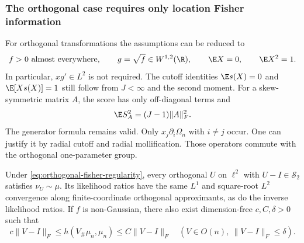 \subsubsection{The orthogonal case requires only location Fisher information}
\label{sec:orthogonal-transformations}

For orthogonal transformations the assumptions can be reduced to
\begin{equation}
 f>0\ \text{almost everywhere},\qquad
 g=\sqrt f\in W^{1,2}(\R),\qquad
 \E X=0,\qquad\E X^2=1.
 \label{eq:orthogonal-fisher-regularity}
\end{equation}
In particular, $xg'\in L^2$ is not required.
The cutoff identities $\E s(X)=0$ and $\E[Xs(X)]=1$ still follow
from $J<\infty$ and the second moment.
For a skew-symmetric matrix $A$, the score has only off-diagonal terms and
\begin{equation}
 \E S_A^2=(J-1)\|A\|_F^2.
 \label{eq:orthogonal-fisher}
\end{equation}
The generator formula remains valid.
Only $x_j\partial_i\Omega_n$ with $i\ne j$ occur.
One can justify it by radial cutoff and radial mollification.
Those operators commute with the orthogonal one-parameter group.

\begin{proposition}
\label{prop:orthogonal-sufficiency}
Under \eqref{eq:orthogonal-fisher-regularity}, every
orthogonal $U$ on $\ell^2$ with $U-I\in\mathcal S_2$ satisfies
$\nu_U\sim\mu$.  Its likelihood ratios have the same $L^1$ and
square-root $L^2$ convergence along finite-coordinate orthogonal
approximants, as do the inverse likelihood ratios.
If $f$ is non-Gaussian, there also exist dimension-free
$c,C,\delta>0$ such that
\begin{equation}
 c\|V-I\|_F\le h(V_\#\mu_n,\mu_n)
                   \le C\|V-I\|_F
 \quad(V\in O(n),\ \|V-I\|_F\le\delta).
 \label{eq:orthogonal-local-hellinger}
\end{equation}
\end{proposition}


